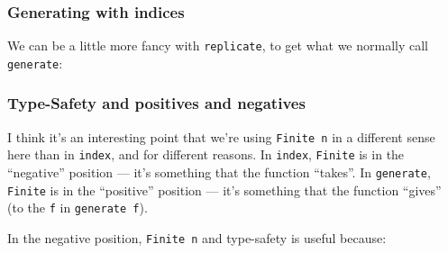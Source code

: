 \documentclass[]{article}
\newenvironment{Shaded}{}{}
\newcommand{\CommentTok}[1]{\textcolor[rgb]{0.38,0.63,0.69}{\textit{#1}}}
\newcommand{\DataTypeTok}[1]{\textcolor[rgb]{0.56,0.13,0.00}{#1}}
\newcommand{\FunctionTok}[1]{\textcolor[rgb]{0.02,0.16,0.49}{#1}}
\newcommand{\KeywordTok}[1]{\textcolor[rgb]{0.00,0.44,0.13}{\textbf{#1}}}
\newcommand{\NormalTok}[1]{#1}
\newcommand{\OperatorTok}[1]{\textcolor[rgb]{0.40,0.40,0.40}{#1}}
\newcommand{\OtherTok}[1]{\textcolor[rgb]{0.00,0.44,0.13}{#1}}
\begin{document}
\hypertarget{generating-with-indices}{%
\subsubsection{Generating with indices}\label{generating-with-indices}}

We can be a little more fancy with \texttt{replicate}, to get what we normally
call \texttt{generate}:

\begin{Shaded}
\end{Shaded}

\hypertarget{type-safety-and-positives-and-negatives}{%
\subsubsection{Type-Safety and positives and
negatives}\label{type-safety-and-positives-and-negatives}}

I think it's an interesting point that we're using \texttt{Finite\ n} in a
different sense here than in \texttt{index}, and for different reasons. In
\texttt{index}, \texttt{Finite} is in the ``negative'' position --- it's
something that the function ``takes''. In \texttt{generate}, \texttt{Finite} is
in the ``positive'' position --- it's something that the function ``gives'' (to
the \texttt{f} in \texttt{generate\ f}).

In the negative position, \texttt{Finite\ n} and type-safety is useful because:
\end{document}
